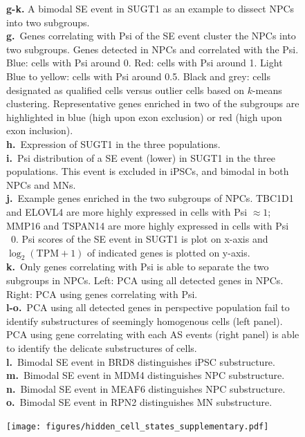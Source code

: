 \begin{figure}[h]
{\textbf{g-k.} A bimodal SE event in SUGT1 as an example to dissect NPCs into two subgroups.\\
\textbf{g.}~Genes correlating with Psi of the SE event cluster the NPCs into two subgroups. Genes detected in NPCs and correlated with the Psi. Blue: cells with Psi around 0. Red: cells with Psi around 1. Light Blue to yellow: cells with Psi around 0.5. Black and grey: cells designated as qualified cells versus outlier cells based on $k$-means clustering. Representative genes enriched in two of the subgroups are highlighted in blue (high upon exon exclusion) or red (high upon exon inclusion). \\
\textbf{h.}~Expression of SUGT1 in the three populations.\\
\textbf{i.}~Psi distribution of a SE event (lower) in SUGT1 in the three populations. This event is excluded in iPSCs, and bimodal in both NPCs and MNs.\\
\textbf{j.}~Example genes enriched in the two subgroups of NPCs. TBC1D1 and ELOVL4 are more highly expressed in cells with Psi $\approx 1$; MMP16 and TSPAN14 are more highly expressed in cells with Psi ~0. Psi scores of the SE event in SUGT1 is plot on x-axis and $\log_2(\mathrm{TPM}+1)$ of indicated genes is plotted on y-axis.\\
\textbf{k.}~Only genes correlating with Psi is able to separate the two subgroups in NPCs. Left: PCA using all detected genes in NPCs. Right: PCA using genes correlating with Psi.\\
\textbf{l-o.}~PCA using all detected genes in perspective population fail to identify substructures of seemingly homogenous cells (left panel). PCA using gene correlating with each AS events (right panel) is able to identify the delicate substructures of cells.\\
\textbf{l.}~Bimodal SE event in BRD8 distinguishes iPSC substructure.\\
\textbf{m.}~Bimodal SE event in MDM4 distinguishes NPC substructure.\\
\textbf{n.}~Bimodal SE event in MEAF6 distinguishes NPC substructure.\\
\textbf{o.}~Bimodal SE event in RPN2 distinguishes MN substructure.\\
}
\label{fig:hidden_cell_states_supplementary}

\end{figure}
\clearpage
\begin{figure}[h]
\ContinuedFloat
\captionsetup{labelformat=empty}
\centering
\texttt{[image: figures/hidden\_cell\_states\_supplementary.pdf]}
\end{figure}
\clearpage

